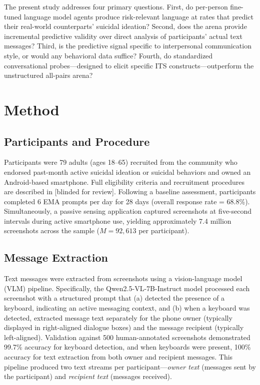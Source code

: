 \documentclass[review,12pt,authoryear]{elsarticle}
\begin{document}
The present study addresses four primary questions. First, do per-person fine-tuned language model agents produce risk-relevant language at rates that predict their real-world counterparts' suicidal ideation? Second, does the arena provide incremental predictive validity over direct analysis of participants' actual text messages? Third, is the predictive signal specific to interpersonal communication style, or would any behavioral data suffice? Fourth, do standardized conversational probes---designed to elicit specific ITS constructs---outperform the unstructured all-pairs arena?


\section{Method}

\subsection{Participants and Procedure}

Participants were 79 adults (ages 18--65) recruited from the community who endorsed past-month active suicidal ideation or suicidal behaviors and owned an Android-based smartphone. Full eligibility criteria and recruitment procedures are described in [blinded for review]. Following a baseline assessment, participants completed 6 EMA prompts per day for 28 days (overall response rate = 68.8\%). Simultaneously, a passive sensing application captured screenshots at five-second intervals during active smartphone use, yielding approximately 7.4 million screenshots across the sample ($M = 92{,}613$ per participant).

\subsection{Message Extraction}

Text messages were extracted from screenshots using a vision-language model (VLM) pipeline. Specifically, the Qwen2.5-VL-7B-Instruct model \citep{qwen2025qwen3} processed each screenshot with a structured prompt that (a) detected the presence of a keyboard, indicating an active messaging context, and (b) when a keyboard was detected, extracted message text separately for the phone owner (typically displayed in right-aligned dialogue boxes) and the message recipient (typically left-aligned). Validation against 500 human-annotated screenshots demonstrated 99.7\% accuracy for keyboard detection, and when keyboards were present, 100\% accuracy for text extraction from both owner and recipient messages. This pipeline produced two text streams per participant---\textit{owner text} (messages sent by the participant) and \textit{recipient text} (messages received).
\end{document}
